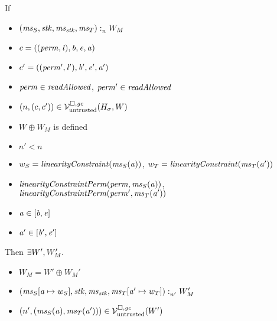 \begin{lemma}
  \label{lem:readcond-cap-works}
  If
  \begin{itemize}
  \item $\memSat{(\ms_S,\stk,\ms_\stk,\ms_T)}{W_M}$
  \item $c = ((\perm,\lin),\baddr,\eaddr,\aaddr)$
  \item $c' = ((\perm',\lin'),\baddr',\eaddr',\aaddr')$
  \item $\perm \in \readAllowed{}$, $\perm' \in \readAllowed{}$
  \item $\npair{(c,c')}\in\lrv(H_\sigma,W)$
  \item $W \oplus W_M$ is defined
  \item $n' < n$
  \item $w_S = \linCons{\ms_S(\aaddr)}$, $w_T = \linCons{\ms_T(\aaddr')}$
  \item $\linConsPerm{\perm}{\ms_S(\aaddr)}$, $\linConsPerm{\perm'}{\ms_T(\aaddr')}$
  \item $\aaddr \in [\baddr,\eaddr]$
  \item $\aaddr' \in [\baddr',\eaddr']$
  \end{itemize}
  Then $\exists W', W_M'\ldotp$
  \begin{itemize}
  \item $W_M = W' \oplus W_M'$
  \item $\memSat[n']{(\ms_S\update{\aaddr}{w_S},\stk,\ms_\stk,\ms_T\update{\aaddr'}{w_T})}{W_M'}$
  \item $\npair[n']{(\ms_S(\aaddr),\ms_T(\aaddr'))} \in \lrv(W')$
  \end{itemize}
\end{lemma}
